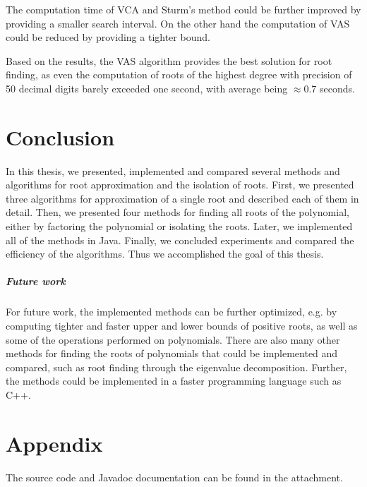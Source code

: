 \documentclass[
  digital, %
  notable,   %
  nolof,     %
  nolot,     %
	final, %
]{fithesis3}
\begin{document}
The computation time of VCA and Sturm's method could be further improved by providing a smaller search interval. On the other hand the computation of VAS could be reduced by providing a tighter bound.

Based on the results, the VAS algorithm provides the best solution for root finding, as even the computation of roots of the highest degree with precision of 50 decimal digits barely exceeded one second, with average being $\approx 0.7$ seconds.

\chapter{Conclusion}
In this thesis, we presented, implemented and compared several methods and algorithms for root approximation and the isolation of roots. First, we presented three algorithms for approximation of a single root and described each of them in detail. Then, we presented four methods for finding all roots of the polynomial, either by factoring the polynomial or isolating the roots. Later, we implemented all of the methods in Java. Finally, we concluded experiments and compared the efficiency of the algorithms. Thus we accomplished the goal of this thesis.

\paragraph{Future work}
For future work, the implemented methods can be further optimized, e.g. by computing tighter and faster upper and lower bounds of positive roots, as well as some of the operations performed on polynomials. There are also many other methods for finding the roots of polynomials that could be implemented and compared, such as root finding through the eigenvalue decomposition. Further, the methods could be implemented in a faster programming language such as C++. 

\printbibliography[heading=bibintoc]


  \makeatletter\thesis@blocks@clear\makeatother

\chapter{Appendix}
The source code and Javadoc documentation can be found in the attachment.
\end{document}
